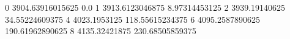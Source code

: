 0 3904.63916015625 0.0
1 3913.6123046875 8.97314453125
2 3939.19140625 34.55224609375
4 4023.1953125 118.55615234375
6 4095.2587890625 190.61962890625
8 4135.32421875 230.68505859375

